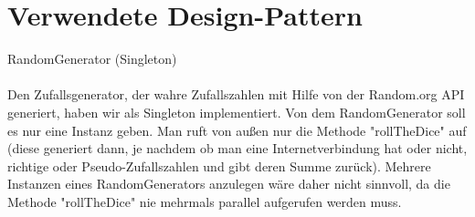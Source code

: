 \chapter{Verwendete Design-Pattern}  

RandomGenerator (Singleton)\\ \\

Den Zufallsgenerator, der wahre Zufallszahlen mit Hilfe von der Random.org API generiert, haben wir als Singleton implementiert. Von dem RandomGenerator soll es nur eine Instanz geben. Man ruft von außen nur die Methode "rollTheDice" auf (diese generiert dann, je nachdem ob man eine Internetverbindung hat oder nicht, richtige oder Pseudo-Zufallszahlen und gibt deren Summe zurück). Mehrere Instanzen eines RandomGenerators anzulegen wäre daher nicht sinnvoll, da die Methode "rollTheDice" nie mehrmals parallel aufgerufen werden muss.